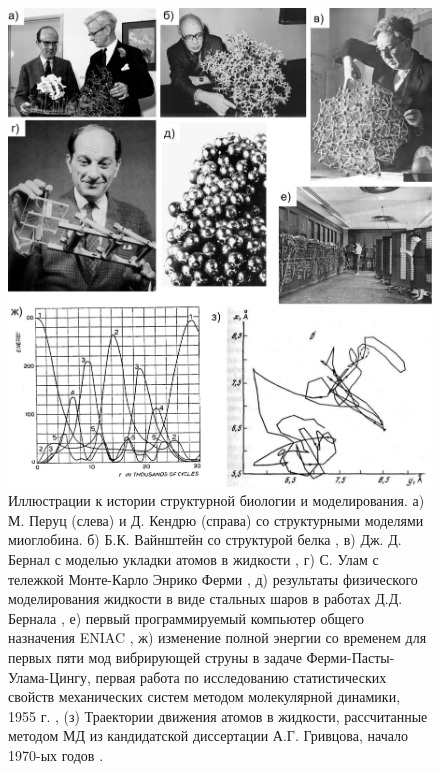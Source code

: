 \begin{figure}[H] 
  \center
  \includegraphics [width=350pt] {images/p1/mod_history.pdf}
  \caption[Иллюстрации к истории структурной биологии и моделирования.]{Иллюстрации к истории структурной биологии и моделирования. а) М. Перуц (слева) и Д. Кендрю (справа) со структурными моделями миоглобина. б) Б.К. Вайнштейн со структурой белка \cite{kovalchuk__2012}, в) Дж. Д. Бернал с моделью укладки атомов в жидкости \cite{finney_bernals_2013}, г) С. Улам с тележкой Монте-Карло Энрико Ферми \cite{gregg_mncp_nodate},  д) результаты физического моделирования жидкости в виде стальных шаров в работах Д.Д. Бернала \cite{finney_bernals_2013}, е) первый программируемый компьютер общего назначения ENIAC \cite{noauthor_english_1947}, ж) изменение полной энергии со временем для первых пяти мод вибрирующей струны в задаче Ферми-Пасты-Улама-Цингу, первая работа по исследованию статистических свойств механических систем методом молекулярной динамики, 1955 г. \cite{fermi_studies_1955}, (з) Траектории движения атомов в жидкости, рассчитанные методом МД из кандидатской диссертации А.Г. Гривцова, начало 1970-ых годов \cite{grivtsov_metodika_1996}.} 
  \label{fig:p1:mod_history}
\end{figure}


